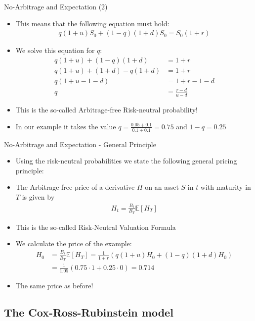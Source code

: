 {No-Arbitrage and Expectation (2)}
\begin{itemize}
  \item This means that the following equation must hold:
  \begin{align*}
    q (1+u) S_0 + (1-q) (1+d) S_0 = S_0 (1+r)
  \end{align*}
  \item We solve this equation for $q$:
  \begin{align*}
    q (1+u) + (1-q) (1+d) & = 1+r \\
    q (1+u) + (1+d) -q (1+d) & = 1+r \\
    q (1+u - 1 -d) & = 1+r -1 - d\\
    q & = \frac{r-d}{u-d}
  \end{align*}
  \item This is the so-called Arbitrage-free Risk-neutral probability!
  \item In our example it takes the value $q = \frac{0.05 + 0.1}{0.1 + 0.1} = 0.75$ and $1-q=0.25$
\end{itemize}



{No-Arbitrage and Expectation - General Principle}
\begin{itemize}
  \item Using the risk-neutral probabilities we state the following general pricing principle:
  \item The Arbitrage-free price of a derivative $H$ on an asset $S$ in $t$ with maturity in $T$ is given by
  \begin{align*}
    H_t = \frac{B_t}{B_T} \mathbb{E}[H_T]
  \end{align*}
  \item This is the so-called Risk-Neutral Valuation Formula
  \vspace{0.3cm}
  \item We calculate the price of the example:
  \begin{align*}
    H_0 & = \frac{B_t}{B_T} \mathbb{E}[H_T] = \frac{1}{1+r} (q (1+u) H_0 + (1-q) (1+d) H_0) \\
    & = \frac{1}{1.05} (0.75 \cdot 1 + 0.25 \cdot 0) = 0.714
  \end{align*}
  \item The same price as before!
\end{itemize}


\subsection{The Cox-Ross-Rubinstein model}
